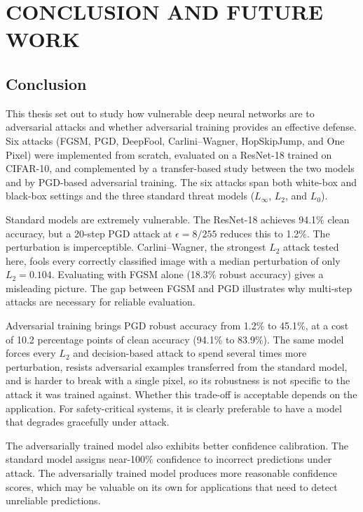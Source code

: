 \chapter{CONCLUSION AND FUTURE WORK}
\label{ch:conclusion}

\section{Conclusion}

This thesis set out to study how vulnerable deep neural networks are to adversarial attacks and whether adversarial training provides an effective defense. Six attacks (FGSM, PGD, DeepFool, Carlini--Wagner, HopSkipJump, and One Pixel) were implemented from scratch, evaluated on a ResNet-18 trained on CIFAR-10, and complemented by a transfer-based study between the two models and by PGD-based adversarial training. The six attacks span both white-box and black-box settings and the three standard threat models ($L_\infty$, $L_2$, and $L_0$).

Standard models are extremely vulnerable. The ResNet-18 achieves 94.1\% clean accuracy, but a 20-step PGD attack at $\epsilon = 8/255$ reduces this to 1.2\%. The perturbation is imperceptible. Carlini--Wagner, the strongest $L_2$ attack tested here, fools every correctly classified image with a median perturbation of only $L_2 = 0.104$. Evaluating with FGSM alone (18.3\% robust accuracy) gives a misleading picture. The gap between FGSM and PGD illustrates why multi-step attacks are necessary for reliable evaluation.

Adversarial training brings PGD robust accuracy from 1.2\% to 45.1\%, at a cost of 10.2 percentage points of clean accuracy (94.1\% to 83.9\%). The same model forces every $L_2$ and decision-based attack to spend several times more perturbation, resists adversarial examples transferred from the standard model, and is harder to break with a single pixel, so its robustness is not specific to the attack it was trained against. Whether this trade-off is acceptable depends on the application. For safety-critical systems, it is clearly preferable to have a model that degrades gracefully under attack.

The adversarially trained model also exhibits better confidence calibration. The standard model assigns near-100\% confidence to incorrect predictions under attack. The adversarially trained model produces more reasonable confidence scores, which may be valuable on its own for applications that need to detect unreliable predictions.

